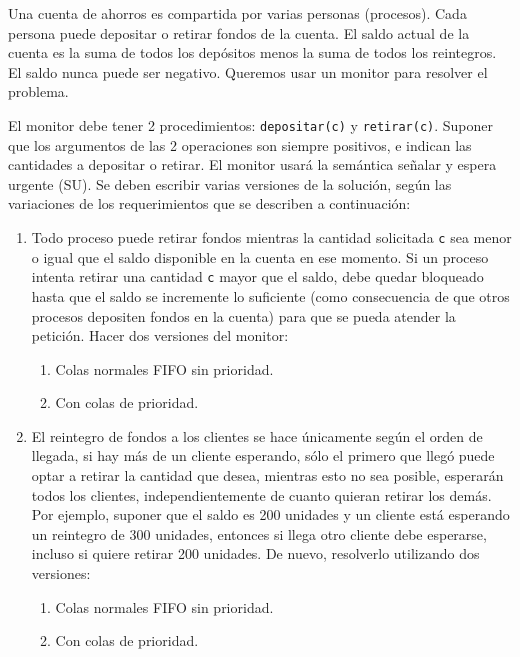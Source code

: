 \begin{ejercicio}
    Una cuenta de ahorros es compartida por varias personas (procesos). Cada persona puede depositar o retirar fondos de la cuenta. El saldo actual de la cuenta es la suma de todos los depósitos menos la suma de todos los reintegros. El saldo nunca puede ser negativo. Queremos usar un monitor para resolver el problema.

    El monitor debe tener 2 procedimientos: \verb|depositar(c)| y \verb|retirar(c)|. Suponer que los argumentos de las 2 operaciones son siempre positivos, e indican las cantidades a depositar o retirar. El monitor usará la semántica señalar y espera urgente (SU). Se deben escribir varias versiones de la solución, según las variaciones de los requerimientos que se describen a continuación:
    \begin{enumerate}
        \item Todo proceso puede retirar fondos mientras la cantidad solicitada \verb|c| sea menor o igual que el saldo disponible en la cuenta en ese momento. Si un proceso intenta retirar una cantidad \verb|c| mayor que el saldo, debe quedar bloqueado hasta que el saldo se incremente lo suficiente (como consecuencia de que otros procesos depositen fondos en la cuenta) para que se pueda atender la petición. Hacer dos versiones del monitor:
        \begin{enumerate}
            \item Colas normales FIFO sin prioridad.
            \item Con colas de prioridad.
        \end{enumerate}
        \item El reintegro de fondos a los clientes se hace únicamente según el orden de llegada, si hay más de un cliente esperando, sólo el primero que llegó puede optar a retirar la cantidad que desea, mientras esto no sea posible, esperarán todos los clientes, independientemente de cuanto quieran retirar los demás. Por ejemplo, suponer que el saldo es 200 unidades y un cliente está esperando un reintegro de 300 unidades, entonces si llega otro cliente debe esperarse, incluso si quiere retirar 200 unidades. De nuevo, resolverlo utilizando dos versiones:
        \begin{enumerate}
            \item Colas normales FIFO sin prioridad.
            \item Con colas de prioridad.
        \end{enumerate}
    \end{enumerate}


\end{ejercicio}
